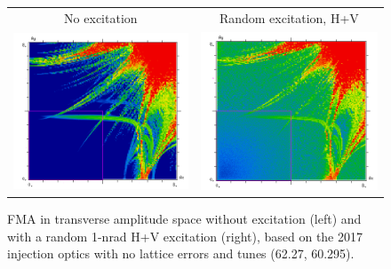\documentclass[aps
,prstab
,reprint
,longbibliography
,preprintnumbers
,showkeys
,amsfonts,amssymb,amsmath
,floatfix
]{revtex4-1}
\newlength{\fmawidth}
\begin{document}
\begin{figure}
  \begin{tabular}{cc}
    No excitation & Random excitation, H+V \\
    \includegraphics[width=\fmawidth]{2017injnocolc15o+19_6noerru_dp0_amp.png} &
    \includegraphics[width=\fmawidth]{2017injnocolc15o+19_6noerruranadthv_1nrad_dp0_amp.png} \\
  \end{tabular}
  \caption{FMA in transverse amplitude space without excitation (left)
    and with a random 1-nrad H+V excitation (right), based on the 2017
    injection optics with no lattice errors and tunes (62.27,
    60.295).}
  \label{fig:ran2017fmaamp}
\end{figure}
\end{document}
